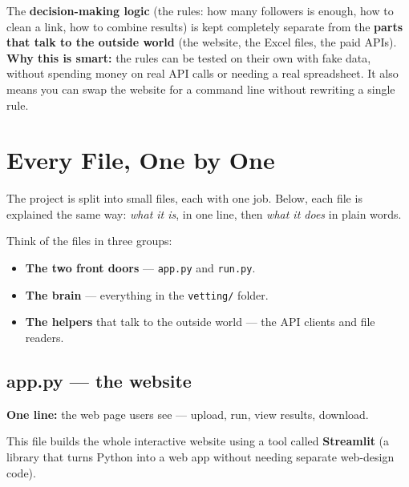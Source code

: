 \documentclass[11pt]{article}
\newcommand{\term}[1]{\textbf{\color{brandpurple}#1}}
\newcommand{\file}[1]{\texttt{\color{inkdark}#1}}
\begin{document}
\begin{analogybox}
The \textbf{decision-making logic} (the rules: how many followers is enough,
how to clean a link, how to combine results) is kept completely separate from
the \textbf{parts that talk to the outside world} (the website, the Excel
files, the paid APIs). \\[4pt]
\textbf{Why this is smart:} the rules can be tested on their own with fake data,
without spending money on real API calls or needing a real spreadsheet. It also
means you can swap the website for a command line without rewriting a single
rule.
\end{analogybox}

\newpage

\section{Every File, One by One}

The project is split into small files, each with one job. Below, each file is
explained the same way: \emph{what it is}, in one line, then \emph{what it does}
in plain words.

Think of the files in three groups:
\begin{itemize}
  \item \textbf{The two front doors} — \file{app.py} and \file{run.py}.
  \item \textbf{The brain} — everything in the \file{vetting/} folder.
  \item \textbf{The helpers} that talk to the outside world — the API clients
  and file readers.
\end{itemize}

\subsection{app.py — the website}
\begin{plainbox}
\textbf{One line:} the web page users see — upload, run, view results, download.
\end{plainbox}

This file builds the whole interactive website using a tool called
\term{Streamlit} (a library that turns Python into a web app without needing
separate web-design code).
\end{document}
